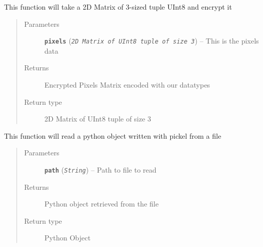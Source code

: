 \documentclass[letterpaper,10pt,english]{sphinxmanual}
\begin{document}

\begin{fulllineitems}
\label{demo:demo.ImageUtils.encrypt}
This function will take a 2D Matrix of 3-sized tuple UInt8 and encrypt it
\begin{quote}\begin{description}
\item[{Parameters}] \leavevmode
\textbf{\texttt{pixels}} (\emph{\texttt{2D Matrix of UInt8 tuple of size 3}}) -- This is the pixels data

\item[{Returns}] \leavevmode
Encrypted Pixels Matrix encoded with our datatypes

\item[{Return type}] \leavevmode
2D Matrix of UInt8 tuple of size 3

\end{description}\end{quote}

\end{fulllineitems}


\begin{fulllineitems}
\label{demo:demo.ImageUtils.load}
This function will read a python object written with pickel from a file
\begin{quote}\begin{description}
\item[{Parameters}] \leavevmode
\textbf{\texttt{path}} (\emph{\texttt{String}}) -- Path to file to read

\item[{Returns}] \leavevmode
Python object retrieved from the file

\item[{Return type}] \leavevmode
Python Object

\end{description}\end{quote}

\end{fulllineitems}

\end{document}
